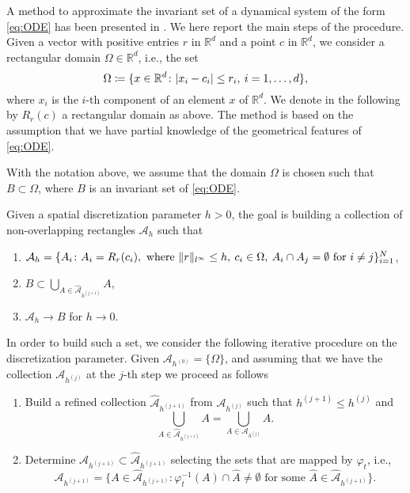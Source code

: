 \documentclass{siamart1116}
\numberwithin{theorem}{section}
\DeclarePairedDelimiter{\abs}{\lvert}{\rvert}
\DeclarePairedDelimiter{\norm}{\|}{\|}
\renewcommand{\phi}{\varphi}
\newcommand{\R}{\mathbb{R}}
\newcommand{\defeq}{\coloneqq}
\begin{document}
A method to approximate the invariant set of a dynamical system of the form \eqref{eq:ODE} has been presented in \cite{DHJ97}. We here report the main steps of the procedure. Given a vector with positive entries $r$ in $\R^d$ and a point $c$ in $\R^d$, we consider a rectangular domain $\Omega \in \R^d$, i.e., the set
\begin{equation}
	\Omega \defeq \{x \in \R^d \colon \abs{x_i - c_i} \leq r_i, \: i = 1, \ldots, d\},
\end{equation}
where $x_i$ is the $i$-th component of an element $x$ of $\R^d$. We denote in the following by $R_r(c)$ a rectangular domain as above. The method is based on the assumption that we have partial knowledge of the geometrical features of \eqref{eq:ODE}.
\begin{assumption} With the notation above, we assume that the domain $\Omega$ is chosen such that $B \subset \Omega$, where $B$ is an invariant set of \eqref{eq:ODE}.
\end{assumption}
Given a spatial discretization parameter $h > 0$, the goal is building a collection of non-overlapping rectangles $\mathcal{A}_h$ such that
\begin{enumerate}
	\item $\mathcal{A}_h = \{A_i \colon A_i = R_r(c_i), \text{ where } \norm{r}_{l^\infty} \leq h, \: c_i \in \Omega, \: A_i \cap A_j = \emptyset \text{ for } i \neq j\}_{i = 1}^N$,
	\item $B \subset \bigcup_{A \in \hat{\mathcal{A}}_{h^{(j+1)}}} A$,
	\item $\mathcal{A}_h \to B$ for $h \to 0$.
\end{enumerate}
In order to build such a set, we consider the following iterative procedure on the discretization parameter. Given $\mathcal{A}_{h^{(0)}} = \{\Omega\}$, and assuming that we have the collection $\mathcal{A}_{h^{(j)}}$ at the $j$-th step we proceed as follows
\begin{enumerate}
	\item Build a refined collection $\hat{\mathcal{A}}_{h^{(j+1)}}$ from $\mathcal{A}_{h^{(j)}}$ such that $h^{(j+1)} \leq h^{(j)}$ and 
		\begin{equation*}
			\textstyle \bigcup_{A \in \hat{\mathcal{A}}_{h^{(j+1)}}} A = \bigcup_{A \in \mathcal{A}_{h^{(j)}}} A.
		\end{equation*}
	\item Determine $\mathcal{A}_{h^{(j+1)}} \subset \hat{\mathcal{A}}_{h^{(j+1)}}$ selecting the sets that are mapped by $\phi_t$, i.e.,
		\begin{equation*}
			\mathcal{A}_{h^{(j+1)}} = \{A \in \hat{\mathcal{A}}_{h^{(j+1)}} \colon \phi_t^{-1}(A) \cap \hat A \neq \emptyset \text{ for some } \hat A \in \hat{\mathcal{A}}_{h^{(j+1)}}\}.
		\end{equation*}
\end{enumerate}
\end{document}

